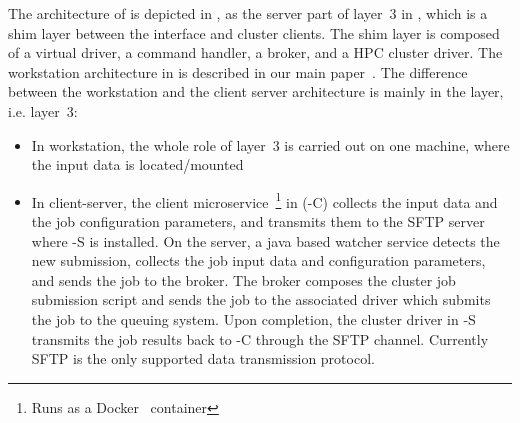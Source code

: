 The architecture of \name is depicted in , as the server part of layer~3 in , which is a shim layer between the \fs interface and cluster clients. The shim layer is composed of a virtual \fs driver, a command handler, a broker, and a HPC cluster driver. The workstation architecture in  is described in our main \name paper~\cite{stroll}. The difference between the workstation and the client server architecture is mainly in the \name layer, i.e. layer~3:
\begin{itemize}
	\item In \name workstation, the whole role of layer~3 is carried out on one machine, where the input data is located/mounted~\cite{stroll}
	\item In \name client-server, the client microservice~\footnote{Runs as a Docker~\cite{docker} container} in (\name-C) collects the input data and the job configuration parameters, and transmits them to the SFTP server where \name-S is installed. On the server, a java based \fs watcher service detects the new submission, collects the job input data and configuration parameters, and sends the job to the broker. The broker composes the cluster job submission script and sends the job to the associated driver which submits the job to the queuing system. Upon completion, the cluster driver in \name-S transmits the job results back to \name-C through the SFTP channel. Currently SFTP is the only supported data transmission protocol.
\end{itemize}

